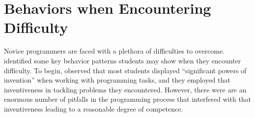
\section{Behaviors when Encountering Difficulty}
\label{sec:behaviors}
Novice programmers are faced with a plethora of difficulties to overcome. \citet{perkins-1986} identified some key behavior patterns students may show when they encounter difficulty. To begin, \citeauthor{perkins-1986} observed that most students displayed ``significant powers of invention'' when working with programming tasks, and they employed that inventiveness in tackling problems they encountered. However, there were are an enormous number of pitfalls in the programming process that interfered with that inventiveness leading to a reasonable degree of competence. 

